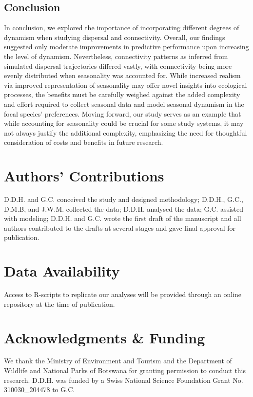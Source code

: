 \documentclass[abstract=on,10pt,a4paper,bibliography=totocnumbered]{article}
\begin{document}
\subsection{Conclusion}

In conclusion, we explored the importance of incorporating different degrees of
dynamism when studying dispersal and connectivity. Overall, our findings
suggested only moderate improvements in predictive performance upon increasing
the level of dynamism. Nevertheless, connectivity patterns as inferred from
simulated dispersal trajectories differed vastly, with connectivity being more
evenly distributed when seasonality was accounted for. While increased realism
via improved representation of seasonality may offer novel insights into
ecological processes, the benefits must be carefully weighed against the added
complexity and effort required to collect seasonal data and model seasonal
dynamism in the focal species' preferences. Moving forward, our study serves as
an example that while accounting for seasonality could be crucial for some study
systems, it may not always justify the additional complexity, emphasizing the
need for thoughtful consideration of costs and benefits in future research.

\section{Authors' Contributions}

D.D.H. and G.C. conceived the study and designed methodology; D.D.H., G.C.,
D.M.B, and J.W.M. collected the data; D.D.H. analysed the data; G.C. assisted
with modeling; D.D.H. and G.C. wrote the first draft of the manuscript and all
authors contributed to the drafts at several stages and gave final approval for
publication.

\section{Data Availability}

Access to R-scripts to replicate our analyses will be provided through an online
repository at the time of publication.

\section{Acknowledgments \& Funding}

We thank the Ministry of Environment and Tourism and the Department of Wildlife
and National Parks of Botswana for granting permission to conduct this
research. D.D.H. was funded by a Swiss National Science Foundation Grant No.
310030\_204478 to G.C.

\newpage
\begingroup
\singlespacing
{}
\endgroup
\end{document}
